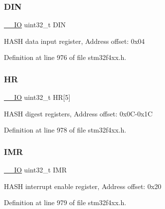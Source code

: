 \subsubsection{\texorpdfstring{D\+IN}{DIN}}
{\footnotesize\ttfamily \hyperlink{group___c_m_s_i_s__core__definitions_gaec43007d9998a0a0e01faede4133d6be}{\+\_\+\+\_\+\+IO} uint32\+\_\+t D\+IN}

H\+A\+SH data input register, Address offset\+: 0x04 

Definition at line 976 of file stm32f4xx.\+h.

\mbox{\label{struct_h_a_s_h___type_def_a02cdb629fbb2bfa63db818ac846847a1}} 
\subsubsection{\texorpdfstring{HR}{HR}}
{\footnotesize\ttfamily \hyperlink{group___c_m_s_i_s__core__definitions_gaec43007d9998a0a0e01faede4133d6be}{\+\_\+\+\_\+\+IO} uint32\+\_\+t HR\mbox{[}5\mbox{]}}

H\+A\+SH digest registers, Address offset\+: 0x0\+C-\/0x1C 

Definition at line 978 of file stm32f4xx.\+h.

\mbox{\label{struct_h_a_s_h___type_def_ae845b86e973b4bf8a33c447c261633f6}} 
\subsubsection{\texorpdfstring{I\+MR}{IMR}}
{\footnotesize\ttfamily \hyperlink{group___c_m_s_i_s__core__definitions_gaec43007d9998a0a0e01faede4133d6be}{\+\_\+\+\_\+\+IO} uint32\+\_\+t I\+MR}

H\+A\+SH interrupt enable register, Address offset\+: 0x20 

Definition at line 979 of file stm32f4xx.\+h.

\mbox{\label{struct_h_a_s_h___type_def_a31675cbea6dc1b5f7de162884a4bb6eb}} 
